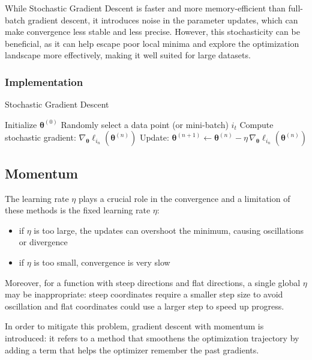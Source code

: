 \documentclass[
 reprint,            %
 amsmath,amssymb,
 aps,
]{revtex4-2}
\begin{document}
While Stochastic Gradient Descent is faster and more memory-efficient than full-batch gradient descent, it introduces noise in the parameter updates, which can make convergence less stable and less precise. However, this stochasticity can be beneficial, as it can help escape poor local minima and explore the optimization landscape more effectively, making it well suited for large datasets.

\subsubsection{Implementation}
\begin{algorithm}[H]
\caption{Stochastic Gradient Descent}
\begin{algorithmic}[1]
\State Initialize $\boldsymbol{\theta}^{(0)}$
    \State Randomly select a data point (or mini-batch) $i_t$
    \State Compute stochastic gradient: $\nabla_{\boldsymbol{\theta}} \ell_{i_n}(\boldsymbol{\theta}^{(n)})$
    \State Update: $\boldsymbol{\theta}^{(n+1)} \gets \boldsymbol{\theta}^{(n)} - \eta \, \nabla_{\boldsymbol{\theta}} \ell_{i_n}(\boldsymbol{\theta}^{(n)})$
\EndFor
\end{algorithmic}
\end{algorithm}

\subsection{Momentum}
The learning rate $\eta$ plays a crucial role in the convergence and a limitation of these methods is the fixed learning rate ${\eta}$: 
\begin{itemize}
    \item if $\eta$ is too large, the updates can overshoot the minimum, causing oscillations or divergence
    \item if $\eta$ is too small, convergence is very slow
\end{itemize}
Moreover, for a function with steep directions and flat directions, a single global $ \eta$ may be inappropriate:
steep coordinates require a smaller step size to avoid oscillation and flat coordinates could use a larger step to speed up progress.

In order to mitigate this problem, gradient descent with momentum is introduced: it refers to a method that smoothens the optimization trajectory by adding a term that helps the optimizer remember the past gradients\cite{hjorthjensen_week37}.
\end{document}
